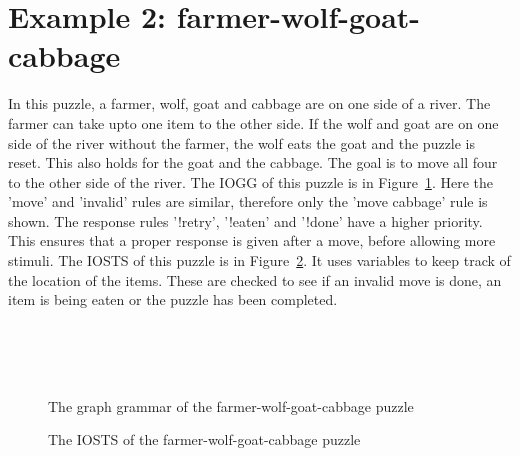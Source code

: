 \section{Example 2: farmer-wolf-goat-cabbage}
In this puzzle, a farmer, wolf, goat and cabbage are on one side of a river. The farmer can take upto one item to the other side. If the wolf and goat are on one side of the river without the farmer, the wolf eats the goat and the puzzle is reset. This also holds for the goat and the cabbage. The goal is to move all four to the other side of the river. The IOGG of this puzzle is in Figure~\ref{fig:gg-fwgc}. Here the 'move' and 'invalid' rules are similar, therefore only the 'move cabbage' rule is shown. The response rules '!retry', '!eaten' and '!done' have a higher priority. This ensures that a proper response is given after a move, before allowing more stimuli. The IOSTS of this puzzle is in Figure~\ref{fig:sts-fwgc}. It uses variables to keep track of the location of the items. These are checked to see if an invalid move is done, an item is being eaten or the puzzle has been completed.

\begin{figure}[ht]
  \begin{center}
    \hspace{20px}
    \\
    \hspace{20px}
    \\
    \\
  \end{center}
  \caption{The graph grammar of the farmer-wolf-goat-cabbage puzzle}
  \label{fig:gg-fwgc}
\end{figure}

\begin{figure}[ht]
  \begin{center}
    
  \end{center}
  \caption{The IOSTS of the farmer-wolf-goat-cabbage puzzle}
  \label{fig:sts-fwgc}
\end{figure}

